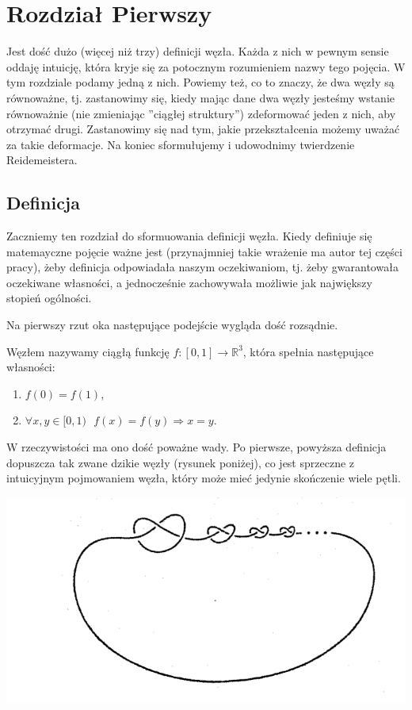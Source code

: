 
\newpage

\section{Rozdział Pierwszy}

Jest dość dużo (więcej niż trzy) definicji węzła. Każda z nich w pewnym sensie oddaję intuicję, która kryje się za potocznym rozumieniem nazwy tego pojęcia. W tym rozdziale podamy 
jedną z nich. 
Powiemy też, co to znaczy, że dwa węzły są równoważne, tj. zastanowimy się, kiedy mając dane dwa węzły jesteśmy wstanie równoważnie (nie zmieniając ''ciągłej struktury'') 
zdeformować jeden z nich, aby otrzymać drugi. Zastanowimy się nad tym, jakie przekształcenia możemy uważać za takie deformacje. Na koniec sformułujemy i udowodnimy 
twierdzenie Reidemeistera.

\subsection{Definicja}

Zaczniemy ten rozdział do sformuowania definicji węzła. Kiedy definiuje się matemayczne pojęcie ważne jest (przynajmniej takie wrażenie ma autor tej części pracy), 
żeby definicja odpowiadała naszym oczekiwaniom, tj. żeby gwarantowała oczekiwane własności, a jednocześnie zachowywała możliwie jak największy 
stopień ogólności. 

Na pierwszy rzut oka następujące podejście wygląda dość rozsądnie.


\begin{definicja}
\label{zla_definicja}
 Węzłem nazywamy ciągłą funkcję $f\colon[0,1]\to\mathbb{R}^3$, która spełnia następujące własności:
 \begin{enumerate}
  \item $f(0) = f(1)$,
  \item $\forall x,y\in[0,1) \ \ \ f(x) = f(y)\Rightarrow x = y$.
 \end{enumerate}
\end{definicja}

W rzeczywistości ma ono dość poważne wady.
Po pierwsze, powyższa definicja dopuszcza tak zwane dzikie węzły (rysunek poniżej), co jest sprzeczne z intuicyjnym pojmowaniem węzła, który może mieć 
jedynie skończenie wiele pętli. 


	\begin{center}

	\includegraphics[scale=0.3]{1/pictures/wild.png}
	\end{center}


